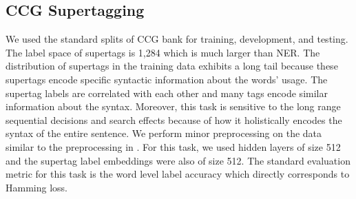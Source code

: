 \documentclass[letterpaper]{article} \usepackage{aaai18}  \usepackage{times}  \usepackage{helvet}  \usepackage{courier}  \usepackage{url}  \usepackage{graphicx}  \frenchspacing
\begin{document}
\subsection{CCG Supertagging}
We used the standard splits of CCG bank \cite{hockenmaier2002acquiring} for training, development, and testing. The label space of supertags is 1,284 which is much larger than NER. The distribution of supertags in the training data exhibits a long tail because these supertags encode specific syntactic information about the words' usage. The supertag labels are correlated with each other and many tags encode similar information about the syntax. Moreover, this task is sensitive to the long range sequential decisions and search effects because of how it holistically encodes the syntax of the entire sentence. We perform minor preprocessing on the data similar to the preprocessing in \cite{vaswani2016supertagging}. For this task, we used hidden layers of size 512 and the supertag label embeddings were also of size 512. The standard evaluation metric for this task is the word level label accuracy which directly corresponds to Hamming loss.
\end{document}
